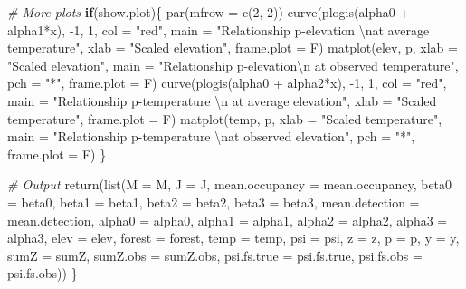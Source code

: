 \documentclass[
]{book}
\newenvironment{Shaded}{\begin{snugshade}}{\end{snugshade}}
\newcommand{\AttributeTok}[1]{\textcolor[rgb]{0.77,0.63,0.00}{#1}}
\newcommand{\CommentTok}[1]{\textcolor[rgb]{0.56,0.35,0.01}{\textit{#1}}}
\newcommand{\ControlFlowTok}[1]{\textcolor[rgb]{0.13,0.29,0.53}{\textbf{#1}}}
\newcommand{\DecValTok}[1]{\textcolor[rgb]{0.00,0.00,0.81}{#1}}
\newcommand{\FunctionTok}[1]{\textcolor[rgb]{0.00,0.00,0.00}{#1}}
\newcommand{\NormalTok}[1]{#1}
\newcommand{\SpecialCharTok}[1]{\textcolor[rgb]{0.00,0.00,0.00}{#1}}
\newcommand{\StringTok}[1]{\textcolor[rgb]{0.31,0.60,0.02}{#1}}
\begin{document}
\begin{Shaded}
\begin{Highlighting}[]
\CommentTok{\# More plots}
\ControlFlowTok{if}\NormalTok{(show.plot)\{}
  \FunctionTok{par}\NormalTok{(}\AttributeTok{mfrow =} \FunctionTok{c}\NormalTok{(}\DecValTok{2}\NormalTok{, }\DecValTok{2}\NormalTok{))}
  \FunctionTok{curve}\NormalTok{(}\FunctionTok{plogis}\NormalTok{(alpha0 }\SpecialCharTok{+}\NormalTok{ alpha1}\SpecialCharTok{*}\NormalTok{x), }\SpecialCharTok{{-}}\DecValTok{1}\NormalTok{, }\DecValTok{1}\NormalTok{, }\AttributeTok{col =} \StringTok{"red"}\NormalTok{, }
      \AttributeTok{main =} \StringTok{"Relationship p{-}elevation }\SpecialCharTok{\textbackslash{}n}\StringTok{at average temperature"}\NormalTok{, }
      \AttributeTok{xlab =} \StringTok{"Scaled elevation"}\NormalTok{, }\AttributeTok{frame.plot =}\NormalTok{ F)}
  \FunctionTok{matplot}\NormalTok{(elev, p, }\AttributeTok{xlab =} \StringTok{"Scaled elevation"}\NormalTok{, }
        \AttributeTok{main =} \StringTok{"Relationship p{-}elevation}\SpecialCharTok{\textbackslash{}n}\StringTok{ at observed temperature"}\NormalTok{, }
        \AttributeTok{pch =} \StringTok{"*"}\NormalTok{, }\AttributeTok{frame.plot =}\NormalTok{ F)}
  \FunctionTok{curve}\NormalTok{(}\FunctionTok{plogis}\NormalTok{(alpha0 }\SpecialCharTok{+}\NormalTok{ alpha2}\SpecialCharTok{*}\NormalTok{x), }\SpecialCharTok{{-}}\DecValTok{1}\NormalTok{, }\DecValTok{1}\NormalTok{, }\AttributeTok{col =} \StringTok{"red"}\NormalTok{, }
      \AttributeTok{main =} \StringTok{"Relationship p{-}temperature }\SpecialCharTok{\textbackslash{}n}\StringTok{ at average elevation"}\NormalTok{, }
      \AttributeTok{xlab =} \StringTok{"Scaled temperature"}\NormalTok{, }\AttributeTok{frame.plot =}\NormalTok{ F)}
  \FunctionTok{matplot}\NormalTok{(temp, p, }\AttributeTok{xlab =} \StringTok{"Scaled temperature"}\NormalTok{, }
        \AttributeTok{main =} \StringTok{"Relationship p{-}temperature }\SpecialCharTok{\textbackslash{}n}\StringTok{at observed elevation"}\NormalTok{, }
        \AttributeTok{pch =} \StringTok{"*"}\NormalTok{, }\AttributeTok{frame.plot =}\NormalTok{ F)}
\NormalTok{\}}

\CommentTok{\# Output}
\FunctionTok{return}\NormalTok{(}\FunctionTok{list}\NormalTok{(}\AttributeTok{M =}\NormalTok{ M, }\AttributeTok{J =}\NormalTok{ J, }\AttributeTok{mean.occupancy =}\NormalTok{ mean.occupancy, }
            \AttributeTok{beta0 =}\NormalTok{ beta0, }\AttributeTok{beta1 =}\NormalTok{ beta1, }\AttributeTok{beta2 =}\NormalTok{ beta2, }\AttributeTok{beta3 =}\NormalTok{ beta3, }
            \AttributeTok{mean.detection =}\NormalTok{ mean.detection, }
            \AttributeTok{alpha0 =}\NormalTok{ alpha0, }\AttributeTok{alpha1 =}\NormalTok{ alpha1, }\AttributeTok{alpha2 =}\NormalTok{ alpha2, }\AttributeTok{alpha3 =}\NormalTok{ alpha3, }
            \AttributeTok{elev =}\NormalTok{ elev, }\AttributeTok{forest =}\NormalTok{ forest, }\AttributeTok{temp =}\NormalTok{ temp, }
            \AttributeTok{psi =}\NormalTok{ psi, }\AttributeTok{z =}\NormalTok{ z, }\AttributeTok{p =}\NormalTok{ p, }\AttributeTok{y =}\NormalTok{ y, }\AttributeTok{sumZ =}\NormalTok{ sumZ, }\AttributeTok{sumZ.obs =}\NormalTok{ sumZ.obs, }
            \AttributeTok{psi.fs.true =}\NormalTok{ psi.fs.true, }\AttributeTok{psi.fs.obs =}\NormalTok{ psi.fs.obs))}
\NormalTok{\}}


\end{Highlighting}
\end{Shaded}
\end{document}
